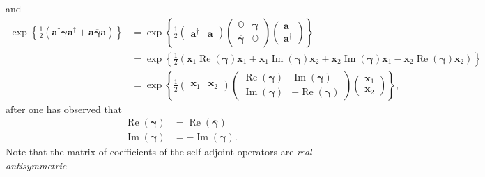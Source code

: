 \documentclass[aps, preprint]{revtex4}
\begin{document}
and
\begin{align}\exp  \left \{\frac{1}{2} \left (\mathbf{a}^{ \dag } \mathbf{\gamma } \mathbf{a}^{ \dag } +\mathbf{a} \overline{\mathbf{\gamma }} \mathbf{a}\right )\right \} &  =\exp  \left \{\frac{1}{2} \left (\begin{array}{cc}\mathbf{a}^{ \dag } & \mathbf{a}\end{array}\right ) \left (\begin{array}{cc}\mathbb{O} & \mathbf{\gamma } \\
\overline{\mathbf{\gamma }} & \mathbb{O}\end{array}\right ) \left (\begin{array}{c}\mathbf{a} \\
\mathbf{a}^{ \dag }\end{array}\right )\right \} \\
 &  =\exp  \left \{\frac{1}{2} \left (\mathbf{x}_{1} \ensuremath{\operatorname*{Re}} \left (\mathbf{\gamma }\right ) \mathbf{x}_{1} +\mathbf{x}_{1} \ensuremath{\operatorname*{Im}} \left (\mathbf{\gamma }\right ) \mathbf{x}_{2} +\mathbf{x}_{2} \ensuremath{\operatorname*{Im}} \left (\mathbf{\gamma }\right ) \mathbf{x}_{1} -\mathbf{x}_{2} \ensuremath{\operatorname*{Re}} \left (\mathbf{\gamma }\right ) \mathbf{x}_{2}\right )\right \} \\
 &  =\exp  \left \{\frac{1}{2} \left (\begin{array}{cc}\mathbf{x}_{1} & \mathbf{x}_{2}\end{array}\right ) \left (\begin{array}{cc}\ensuremath{\operatorname*{Re}} \left (\mathbf{\gamma }\right ) & \ensuremath{\operatorname*{Im}} \left (\mathbf{\gamma }\right ) \\
\ensuremath{\operatorname*{Im}} \left (\mathbf{\gamma }\right ) &  -\ensuremath{\operatorname*{Re}} \left (\mathbf{\gamma }\right )\end{array}\right ) \left (\begin{array}{c}\mathbf{x}_{1} \\
\mathbf{x}_{2}\end{array}\right )\right \}\text{,}\end{align}after one has observed that
\begin{align}\ensuremath{\operatorname*{Re}} \left (\mathbf{\gamma }\right ) &  =\ensuremath{\operatorname*{Re}} \left (\overline{\mathbf{\gamma }}\right ) \\
\ensuremath{\operatorname*{Im}} \left (\mathbf{\gamma }\right ) &  = -\ensuremath{\operatorname*{Im}} \left (\overline{\mathbf{\gamma }}\right )\text{.}\end{align}Note that the matrix of coefficients of the self adjoint operators are \emph{real antisymmetric}
\end{document}
